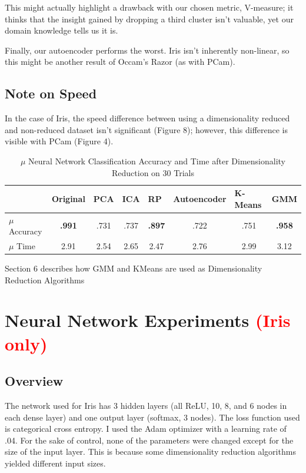\documentclass[letter]{article}
\begin{document}
This might actually highlight a drawback with our chosen metric, V-measure; it thinks that the insight gained by dropping a third cluster isn't valuable, yet our domain knowledge tells us it is.

Finally, our autoencoder performs the worst. Iris isn't inherently non-linear, so this might be another result of Occam's Razor (as with PCam).

\subsection{Note on Speed}
In the case of Iris, the speed difference between using a dimensionality reduced and non-reduced dataset isn't significant (Figure 8); however, this difference is visible with PCam (Figure 4).

\begin{table}
  \centering
  \begin{tabular}{l|c|c|c|c|c|c|c|}
  \cline{2-8}
  \multicolumn{1}{c|}{} & \multicolumn{1}{l|}{Original} & \multicolumn{1}{l|}{PCA} & \multicolumn{1}{l|}{ICA} & \multicolumn{1}{l|}{RP} & \multicolumn{1}{l|}{Autoencoder} & \multicolumn{1}{l|}{K-Means} & \multicolumn{1}{l|}{GMM} \\ \hline
  \multicolumn{1}{|l|}{$\mu$ Accuracy} & \textbf{.991} & .731 & .737 & \textbf{.897} & .722 & .751 & \textbf{.958} \\ \hline
  \multicolumn{1}{|l|}{$\mu$ Time} & 2.91 & 2.54 & 2.65 & 2.47 & 2.76 & 2.99 & 3.12 \\ \hline
  \end{tabular}
  \caption{$\mu$ Neural Network Classification Accuracy and Time after Dimensionality Reduction on 30 Trials}
  Section 6 describes how GMM and KMeans are used as Dimensionality Reduction Algorithms
\end{table}

\section{Neural Network Experiments \textcolor{red}{(Iris only)}}
\subsection{Overview}
The network used for Iris has 3 hidden layers (all ReLU, 10, 8, and 6 nodes in each dense layer) and one output layer (softmax, 3 nodes). The loss function used is categorical cross entropy. I used the Adam optimizer with a learning rate of .04. For the sake of control, none of the parameters were changed except for the size of the input layer. This is because some dimensionality reduction algorithms yielded different input sizes.
\end{document}
